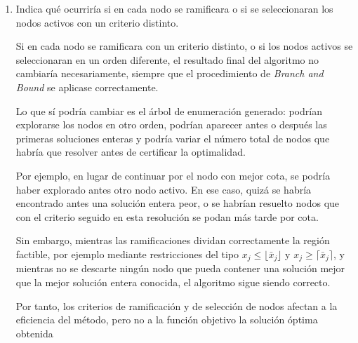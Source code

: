 \begin{enumerate}[label=\alph*)]
\begin{enumerate}
No queda ningún nodo activo que pueda mejorar la solución encontrada. Por tanto, la solución óptima del problema entero es $x_1^*=0$, $x_2^*=3$, con valor óptimo $z^*=12$.
```

\end{enumerate}



\item Indica qué ocurriría si en cada nodo se ramificara  o si se seleccionaran los nodos activos con un criterio distinto.


Si en cada nodo se ramificara con un criterio distinto, o si los nodos activos se seleccionaran en un orden diferente, el resultado final del algoritmo no cambiaría necesariamente, siempre que el procedimiento de \emph{Branch and Bound} se aplicase correctamente.

Lo que sí podría cambiar es el árbol de enumeración generado: podrían explorarse los nodos en otro orden, podrían aparecer antes o después las primeras soluciones enteras y podría variar el número total de nodos que habría que resolver antes de certificar la optimalidad.

Por ejemplo, en lugar de continuar por el nodo con mejor cota, se podría haber explorado antes otro nodo activo. En ese caso, quizá se habría encontrado antes una solución entera peor, o se habrían resuelto nodos que con el criterio seguido en esta resolución se podan más tarde por cota.

Sin embargo, mientras las ramificaciones dividan correctamente la región factible, por ejemplo mediante restricciones del tipo $x_j\leq \lfloor \bar{x}_j\rfloor$ y $x_j\geq \lceil \bar{x}_j\rceil$, y mientras no se descarte ningún nodo que pueda contener una solución mejor que la mejor solución entera conocida, el algoritmo sigue siendo correcto.

Por tanto, los criterios de ramificación y de selección de nodos afectan a la eficiencia del método, pero no a la función objetivo la solución óptima obtenida


\end{enumerate}